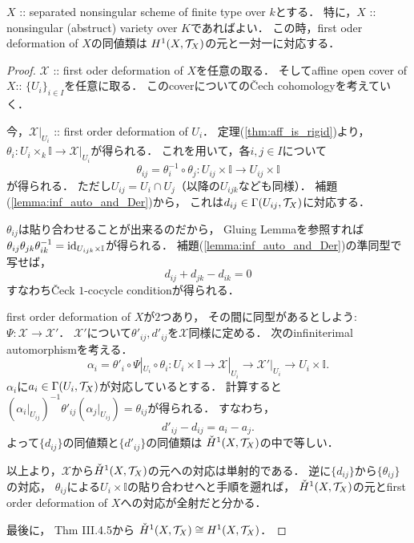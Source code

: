 \documentclass[a4paper]{jsarticle}
\newcommand{\dualnum}{\mathbb{I}}
\newcommand{\famX}{\mathcal{X}}
\begin{document}
    \begin{Thm}
        $X$ :: separated nonsingular scheme of finite type over $k$とする．
        特に，$X$ :: nonsingular (abstruct) variety over $K$であればよい．
        この時，first oder deformation of $X$の同値類は
        $H^1(X, \mathcal{T}_X)$の元と一対一に対応する．
    \end{Thm}
    \begin{proof}
        $\famX$ :: first oder deformation of $X$を任意の取る．
        そしてaffine open cover of $X$:: $\{U_i\}_{i \in I}$を任意に取る．
        このcoverについての\v{C}ech cohomologyを考えていく．

        今，$\famX|_{U_i}$ :: first order deformation of $U_i$．
        定理(\ref{thm:aff_is_rigid})より，
        $\theta_{i}: U_i \times_{k} \dualnum \to \famX|_{U_i}$が得られる．
        これを用いて，各$i,j \in I$について
        \[ \theta_{ij}=\theta_{i}^{-1} \circ \theta_{j}:U_{ij} \times \dualnum \to U_{ij} \times \dualnum \]
        が得られる．
        ただし$U_{ij}=U_i \cap U_j$（以降の$U_{ijk}$なども同様）．
        補題(\ref{lemma:inf_auto_and_Der})から，
        これは$d_{ij} \in \Gamma(U_{ij}, \mathcal{T}_{X})$に対応する．
        
        $\theta_{ij}$は貼り合わせることが出来るのだから，
        Gluing Lemmaを参照すれば
        $\theta_{ij} \theta_{jk} \theta_{ik}^{-1}=\id[U_{ijk} \times \dualnum]$が得られる．
        補題(\ref{lemma:inf_auto_and_Der})の準同型で写せば，
        \[ d_{ij}+d_{jk}-d_{ik}=0 \]
        すなわち\v{C}eck $1$-cocycle conditionが得られる．

        first order deformation of $X$が$2$つあり，
        その間に同型があるとしよう: $\Psi: \famX \to \famX'$．
        $\famX'$について$\theta'_{ij}, d'_{ij}$を$\famX$同様に定める．
        次のinfiniterimal automorphismを考える．
        \[
            \alpha_{i}=\theta'_{i} \circ \Psi|_{U_i} \circ \theta_{i}:
            U_i \times \dualnum \to \famX|_{U_i} \to \famX'|_{U_i} \to U_i \times \dualnum.
        \]
        $\alpha_i$に$a_i \in \Gamma(U_i, \mathcal{T}_X)$が対応しているとする．
        計算すると
        $(\alpha_{i}|_{U_{ij}})^{-1} \theta'_{ij} (\alpha_{j}|_{U_{ij}})=\theta_{ij}$が得られる．
        すなわち，
        \[ d'_{ij}-d_{ij}=a_{i}-a_{j}. \]
        よって$\{d_{ij}\}$の同値類と$\{d'_{ij}\}$の同値類は
        $\check{H}^1(X, \mathcal{T}_X)$の中で等しい．

        以上より，$\famX$から$\check{H}^1(X, \mathcal{T}_X)$の元への対応は単射的である．
        逆に$\{d_{ij}\}$から$\{\theta_{ij}\}$の対応，
        $\theta_{ij}$による$U_{i} \times \dualnum$の貼り合わせへと手順を遡れば，
        $\check{H}^1(X, \mathcal{T}_X)$の元とfirst order deformation of $X$への対応が全射だと分かる．

        最後に，\cite{HarAG} Thm III.4.5から
        $\check{H}^1(X, \mathcal{T}_X) \cong H^1(X, \mathcal{T}_X)$．
    \end{proof}
\end{document}
